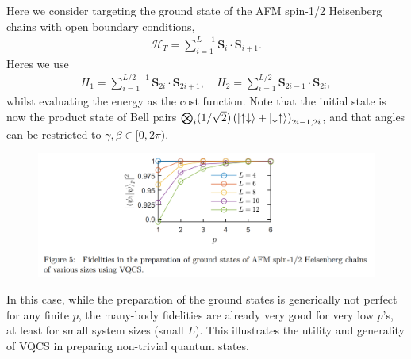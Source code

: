 \documentclass{book}
\theoremstyle{definition}
\newcommand{\had}{\mathcal{H}}
\newcommand{\lp}{\left(}
\newcommand{\rp}{\right)}
\begin{document}
Here we consider targeting the ground state of the AFM spin-1/2 Heisenberg chains with open boundary conditions,
\begin{align}
\had_T = \sum^{L-1}_{i=1}\bm{S}_i \cdot \bm{S}_{i+1}.
\end{align}
Heres we use
\begin{align}
H_1 = \sum^{L/2-1}_{i=1} \bm{S}_{2i} \cdot \bm{S}_{2i+1}, \quad H_2 = \sum^{L/2}_{i=1} \bm{S}_{2i-1} \cdot \bm{S}_{2i}, 
\end{align}
whilst evaluating the energy as the cost function. Note that the initial state is now the product state of Bell pairs $\bigotimes_i (1/\sqrt{2})\lp \ket{\uparrow\downarrow} + \ket{\downarrow\uparrow} \rp_{2i-1,2i}$, and that angles can be restricted to $\gamma,\beta \in [0,2\pi)$.
\begin{figure}[!htb]
	\centering
	\includegraphics[scale=0.3]{afm}
\end{figure}

In this case, while the preparation of the ground states is generically not perfect for any finite $p$, the many-body fidelities are already very good for very low $p$'s, at least for small system sizes (small $L$). This illustrates the utility and generality of VQCS in preparing non-trivial quantum states. 
\end{document}
